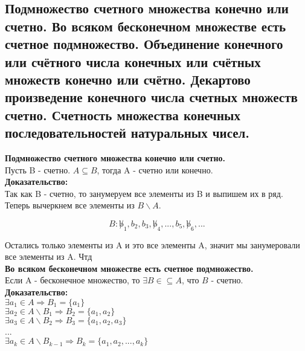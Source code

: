 \subsection{Подмножество счетного множества конечно или счетно. Во всяком бесконечном множестве есть счетное подмножество. Объединение конечного или счётного числа конечных или счётных множеств конечно или счётно. Декартово произведение конечного числа счетных множеств счетно. Счетность множества конечных последовательностей натуральных чисел.}

\textbf{Подмножество счетного множества конечно или счетно.}\\

Пусть B - счетно. $A \subseteq B$, тогда A - счетно или конечно.\\

\noindent \textbf{Доказательство:} \\

Так как B - счетно, то занумеруем все элементы из B и выпишем их в ряд. Теперь вычеркнем все элементы из $B \backslash A$.

\begin{equation*}
    B : \not b_1, b_2, b_3, \not b_4, ..., b_5, \not b_6, ...
\end{equation*}

Остались только элементы из A и это все элементы A, значит мы занумеровали все элементы из A. Чтд\\

\textbf{Во всяком бесконечном множестве есть счетное подмножество.}\\

Если A - бесконечное множество, то $\exists B \in \subseteq A$, что $B$ - счетно.\\

\noindent \textbf{Доказательство:}\\

$\exists a_1 \in A \Rightarrow B_1 = \{a_1\}$\\

$\exists a_2 \in A \backslash B_1 \Rightarrow B_2 = \{a_1, a_2\}$\\

$\exists a_3 \in A \backslash B_2 \Rightarrow B_3 = \{a_1, a_2, a_3\}$\\

...\\

$\exists a_k \in A \backslash B_{k - 1} \Rightarrow B_k = \{a_1, a_2, ..., a_k\}$\\

